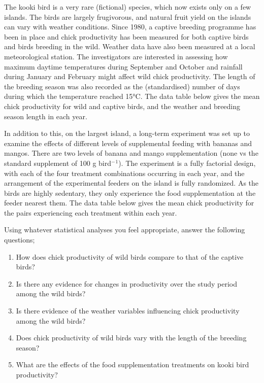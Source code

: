 \documentclass[
]{book}
\providecommand{\tightlist}{%
  \setlength{\itemsep}{0pt}\setlength{\parskip}{0pt}}
\begin{document}
The kooki bird is a very rare (fictional) species, which now exists only on a few islands. The birds are largely frugivorous, and natural fruit yield on the islands can vary with weather conditions. Since 1980, a captive breeding programme has been in place and chick productivity has been measured for both captive birds and birds breeding in the wild. Weather data have also been measured at a local meteorological station. The investigators are interested in assessing how maximum daytime temperatures during September and October and rainfall during January and February might affect wild chick productivity. The length of the breeding season was also recorded as the (standardised) number of days during which the temperature reached 15°C. The data table below gives the mean chick productivity for wild and captive birds, and the weather and breeding season length in each year.

In addition to this, on the largest island, a long-term experiment was set up to examine the effects of different levels of supplemental feeding with bananas and mangos. There are two levels of banana and mango supplementation (none vs the standard supplement of 100 g bird\(^-\)\(^1\)). The experiment is a fully factorial design, with each of the four treatment combinations occurring in each year, and the arrangement of the experimental feeders on the island is fully randomized. As the birds are highly sedentary, they only experience the food supplementation at the feeder nearest them. The data table below gives the mean chick productivity for the pairs experiencing each treatment within each year.

Using whatever statistical analyses you feel appropriate, answer the following questions;

\begin{enumerate}
\def\labelenumi{\arabic{enumi})}
\tightlist
\item
  How does chick productivity of wild birds compare to that of the captive birds?
\item
  Is there any evidence for changes in productivity over the study period among the wild birds?\\
\item
  Is there evidence of the weather variables influencing chick productivity among the wild birds?
\item
  Does chick productivity of wild birds vary with the length of the breeding season?
\item
  What are the effects of the food supplementation treatments on kooki bird productivity?
\end{enumerate}
\end{document}
